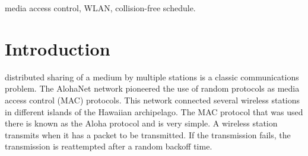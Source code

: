 \documentclass[journal]{IEEEtran}
\begin{document}
\begin{IEEEkeywords}
 media access control, WLAN, collision-free schedule.
\end{IEEEkeywords}






%
\IEEEpeerreviewmaketitle



\section{Introduction}
% 
% 
% 
% 
 distributed sharing of a medium by multiple stations is a classic communications problem. 
The AlohaNet network \cite{abramson2009asw} pioneered the use of random protocols as media access control (MAC) protocols.
This network connected several wireless stations in different islands of the Hawaiian archipelago.
The MAC protocol that was used there is known as the Aloha protocol and is very simple.
A wireless station transmits when it has a packet to be transmitted. 
If the transmission fails, the transmission is reattempted after a random backoff time.
\end{document}
